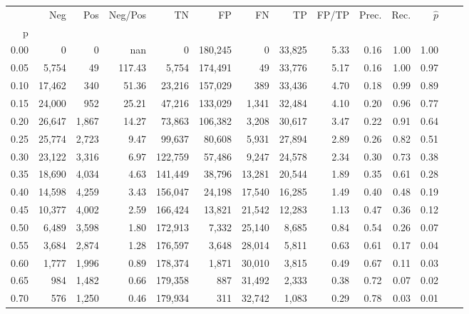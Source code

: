 \begin{tabular}{rrrrrrrrrrrrrr}
\toprule
{} &     Neg &    Pos & Neg/Pos &       TN &       FP &      FN &      TP & FP/TP & Prec. &  Rec. & $\hat{p}$ \\
p    &         &        &         &          &          &         &         &       &       &       &           \\
\midrule
0.00 &       0 &      0 &     nan &        0 &  180,245 &       0 &  33,825 &  5.33 &  0.16 &  1.00 &      1.00 \\
0.05 &   5,754 &     49 &  117.43 &    5,754 &  174,491 &      49 &  33,776 &  5.17 &  0.16 &  1.00 &      0.97 \\
0.10 &  17,462 &    340 &   51.36 &   23,216 &  157,029 &     389 &  33,436 &  4.70 &  0.18 &  0.99 &      0.89 \\
0.15 &  24,000 &    952 &   25.21 &   47,216 &  133,029 &   1,341 &  32,484 &  4.10 &  0.20 &  0.96 &      0.77 \\
0.20 &  26,647 &  1,867 &   14.27 &   73,863 &  106,382 &   3,208 &  30,617 &  3.47 &  0.22 &  0.91 &      0.64 \\
0.25 &  25,774 &  2,723 &    9.47 &   99,637 &   80,608 &   5,931 &  27,894 &  2.89 &  0.26 &  0.82 &      0.51 \\
0.30 &  23,122 &  3,316 &    6.97 &  122,759 &   57,486 &   9,247 &  24,578 &  2.34 &  0.30 &  0.73 &      0.38 \\
0.35 &  18,690 &  4,034 &    4.63 &  141,449 &   38,796 &  13,281 &  20,544 &  1.89 &  0.35 &  0.61 &      0.28 \\
0.40 &  14,598 &  4,259 &    3.43 &  156,047 &   24,198 &  17,540 &  16,285 &  1.49 &  0.40 &  0.48 &      0.19 \\
0.45 &  10,377 &  4,002 &    2.59 &  166,424 &   13,821 &  21,542 &  12,283 &  1.13 &  0.47 &  0.36 &      0.12 \\
0.50 &   6,489 &  3,598 &    1.80 &  172,913 &    7,332 &  25,140 &   8,685 &  0.84 &  0.54 &  0.26 &      0.07 \\
0.55 &   3,684 &  2,874 &    1.28 &  176,597 &    3,648 &  28,014 &   5,811 &  0.63 &  0.61 &  0.17 &      0.04 \\
0.60 &   1,777 &  1,996 &    0.89 &  178,374 &    1,871 &  30,010 &   3,815 &  0.49 &  0.67 &  0.11 &      0.03 \\
0.65 &     984 &  1,482 &    0.66 &  179,358 &      887 &  31,492 &   2,333 &  0.38 &  0.72 &  0.07 &      0.02 \\
0.70 &     576 &  1,250 &    0.46 &  179,934 &      311 &  32,742 &   1,083 &  0.29 &  0.78 &  0.03 &      0.01 \\

\end{tabular}
